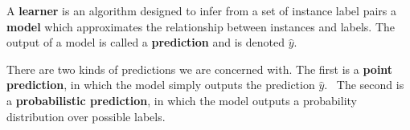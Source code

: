 A {\bf learner} is an algorithm designed to infer from a set of instance label pairs a {\bf model} which approximates the relationship between instances and labels. The output of a model is called a {\bf prediction} and is denoted $\hat{y}$. 

There are two kinds of predictions we are concerned with. The first is a {\bf point prediction}, in which the model simply outputs the prediction $\hat{y}$.  
~The second is a {\bf probabilistic prediction}, in which the model outputs a probability distribution over possible labels. 

